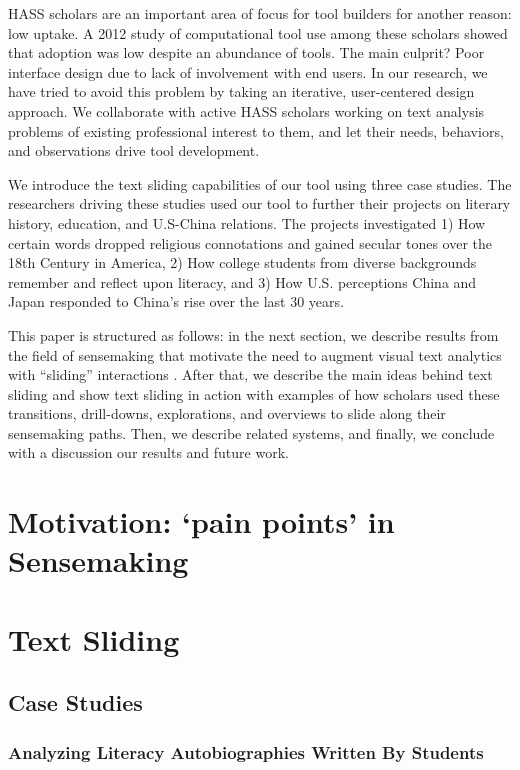 \documentclass{sig-alternate}
\begin{document}
HASS scholars are an important area of focus for tool builders for another reason: low uptake. A 2012 study of computational tool use among these scholars showed that adoption was low despite an abundance of tools. The main culprit? Poor interface design due to lack of involvement with end users. In our research, we have tried to avoid this problem by taking an iterative, user-centered design approach. We collaborate with active HASS scholars working on text analysis problems of existing professional interest to them, and let their needs, behaviors, and observations drive tool development.

We introduce the text sliding capabilities of our tool using three case studies. The researchers driving these studies used our tool to further their projects on literary history, education, and U.S-China relations. The projects investigated 1) How certain words dropped religious connotations and gained secular tones over the 18th Century in America, 2) How college students from diverse backgrounds remember and reflect upon literacy, and 3) How U.S. perceptions China and Japan responded to China's rise over the last 30 years.

This paper is structured as follows: in the next section, we describe results from the field of sensemaking that motivate the need to augment visual text analytics with ``sliding'' interactions . After that, we describe the main ideas behind text sliding and show text sliding in action with examples of how scholars used these transitions, drill-downs, explorations, and overviews to slide along their sensemaking paths. Then, we describe related systems, and finally, we conclude with a discussion our results and future work.

\section{Motivation: `pain points' in Sensemaking}

\section{Text Sliding}

\subsection{Case Studies}

\subsubsection{Analyzing Literacy Autobiographies Written By Students}
\end{document}
